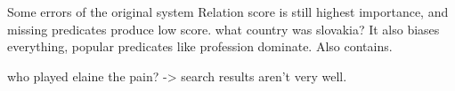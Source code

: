 Some errors of the original system 
Relation score is still highest importance, and missing predicates produce low score.
what country was slovakia?
It also biases everything, popular predicates like profession dominate. Also contains.

who played elaine the pain? -> search results aren't very well.




